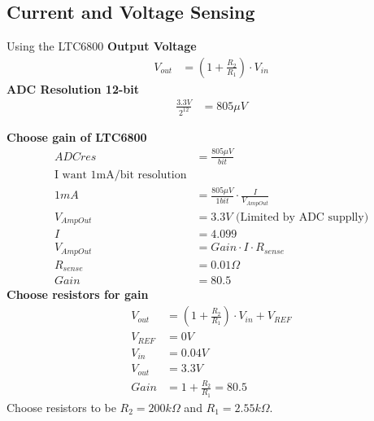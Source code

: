 \documentclass{article}
\numberwithin{figure}{section}
\numberwithin{equation}{section}
\begin{document}
{\subsection{Current and Voltage Sensing}\label{app:cvsense}
Using the LTC6800
\textbf{Output Voltage}
\begin{align}
  \label{eq:vout}
  V_{out} &= \left(1+\frac{R_2}{R_1}\right)\cdot V_{in}
\end{align}
\textbf{ADC Resolution 12-bit}
\begin{align}
  \label{eq:adcres}
  \frac{3.3V}{2^{12}} &= 805\mu V
\end{align}

\textbf{Choose gain of LTC6800}
\begin{align}
  \label{eq:asense}
  ADCres &= \frac{805\mu V}{bit} \\
  \mbox{I want 1mA/bit resolution} \\
  1mA &= \frac{805\mu V}{1bit} \cdot \frac{I}{V_{AmpOut}} \\
  V_{AmpOut} &= 3.3V \mbox{ (Limited by ADC supplly)} \\
  I &= 4.099 \\
  V_{AmpOut} &= Gain \cdot I \cdot R_{sense} \\
  R_{sense} &= 0.01 \Omega \\
  Gain &= 80.5
\end{align}
\textbf{Choose resistors for gain}
\begin{align}
  \label{eq:gainresistors}
  V_{out} &= \left(1+\frac{R_2}{R_1}\right)\cdot V_{in} + V_{REF} \\
  V_{REF} &= 0V \\
  V_{in} &= 0.04V \\
  V_{out} &= 3.3V \\
  Gain &= 1+\frac{R_2}{R_1} = 80.5
\end{align}
Choose resistors to be $R_2=200k\Omega$ and $R_1=2.55k\Omega$.

}
\end{document}
